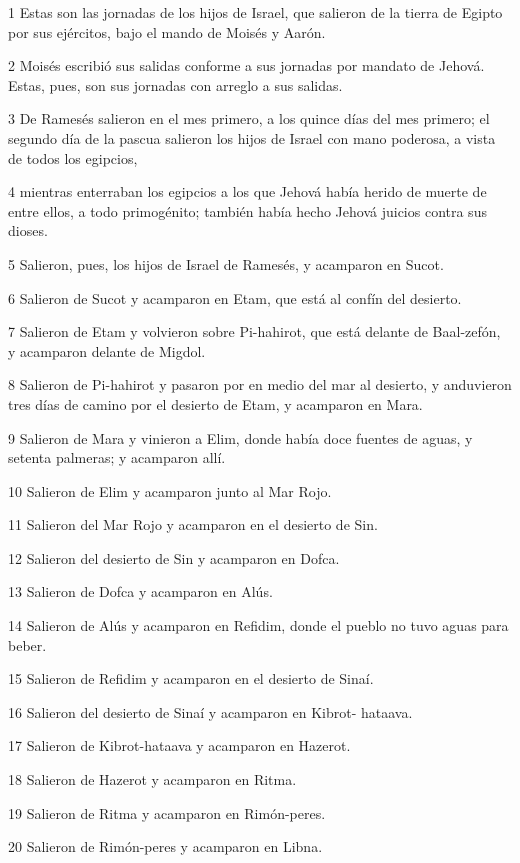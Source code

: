 \par 1 Estas son las jornadas de los hijos de Israel, que salieron de la tierra de Egipto por sus ejércitos, bajo el mando de Moisés y Aarón.
\par 2 Moisés escribió sus salidas conforme a sus jornadas por mandato de Jehová. Estas, pues, son sus jornadas con arreglo a sus salidas.
\par 3 De Ramesés salieron en el mes primero, a los quince días del mes primero; el segundo día de la pascua salieron los hijos de Israel con mano poderosa, a vista de todos los egipcios,
\par 4 mientras enterraban los egipcios a los que Jehová había herido de muerte de entre ellos, a todo primogénito; también había hecho Jehová juicios contra sus dioses.
\par 5 Salieron, pues, los hijos de Israel de Ramesés, y acamparon en Sucot.
\par 6 Salieron de Sucot y acamparon en Etam, que está al confín del desierto.
\par 7 Salieron de Etam y volvieron sobre Pi-hahirot, que está delante de Baal-zefón, y acamparon delante de Migdol.
\par 8 Salieron de Pi-hahirot y pasaron por en medio del mar al desierto, y anduvieron tres días de camino por el desierto de Etam, y acamparon en Mara.
\par 9 Salieron de Mara y vinieron a Elim, donde había doce fuentes de aguas, y setenta palmeras; y acamparon allí.
\par 10 Salieron de Elim y acamparon junto al Mar Rojo.
\par 11 Salieron del Mar Rojo y acamparon en el desierto de Sin.
\par 12 Salieron del desierto de Sin y acamparon en Dofca.
\par 13 Salieron de Dofca y acamparon en Alús.
\par 14 Salieron de Alús y acamparon en Refidim, donde el pueblo no tuvo aguas para beber.
\par 15 Salieron de Refidim y acamparon en el desierto de Sinaí.
\par 16 Salieron del desierto de Sinaí y acamparon en Kibrot- hataava.
\par 17 Salieron de Kibrot-hataava y acamparon en Hazerot.
\par 18 Salieron de Hazerot y acamparon en Ritma.
\par 19 Salieron de Ritma y acamparon en Rimón-peres.
\par 20 Salieron de Rimón-peres y acamparon en Libna.
